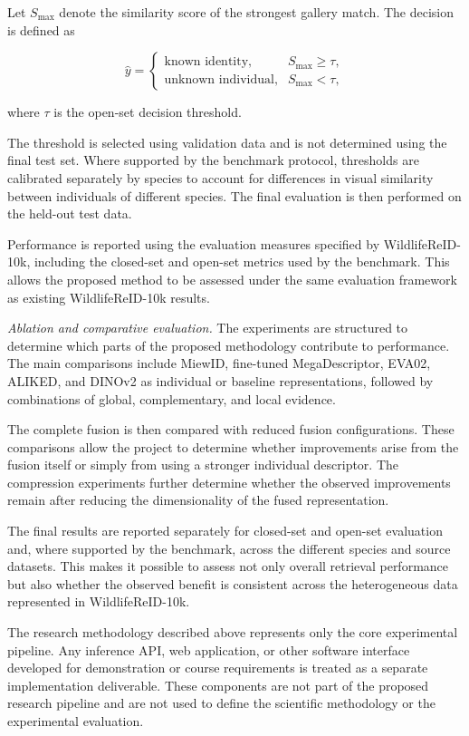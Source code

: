\documentclass[runningheads]{llncs}
\begin{document}
Let $S_{\max}$ denote the similarity score of the strongest gallery match. The decision is defined as

\[
\hat{y} =
\begin{cases}
\text{known identity}, & S_{\max} \geq \tau,\\
\text{unknown individual}, & S_{\max} < \tau,
\end{cases}
\]

where $\tau$ is the open-set decision threshold.

The threshold is selected using validation data and is not determined using the final test set.
Where supported by the benchmark protocol, thresholds are calibrated separately by species to
account for differences in visual similarity between individuals of different species. The final
evaluation is then performed on the held-out test data.

Performance is reported using the evaluation measures specified by WildlifeReID-10k, including the
closed-set and open-set metrics used by the benchmark. This allows the proposed method to be assessed
under the same evaluation framework as existing WildlifeReID-10k results.

\emph{Ablation and comparative evaluation.}
The experiments are structured to determine which parts of the proposed methodology contribute to
performance. The main comparisons include MiewID, fine-tuned MegaDescriptor, EVA02, ALIKED, and DINOv2
as individual or baseline representations, followed by combinations of global, complementary, and
local evidence.

The complete fusion is then compared with reduced fusion configurations. These comparisons allow the
project to determine whether improvements arise from the fusion itself or simply from using a
stronger individual descriptor. The compression experiments further determine whether the observed
improvements remain after reducing the dimensionality of the fused representation.

The final results are reported separately for closed-set and open-set evaluation and, where supported
by the benchmark, across the different species and source datasets. This makes it possible to assess
not only overall retrieval performance but also whether the observed benefit is consistent across
the heterogeneous data represented in WildlifeReID-10k.

The research methodology described above represents only the core experimental pipeline. Any
inference API, web application, or other software interface developed for demonstration or course
requirements is treated as a separate implementation deliverable. These components are not part of
the proposed research pipeline and are not used to define the scientific methodology or the
experimental evaluation.
\end{document}
